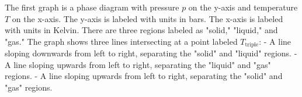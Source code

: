 The first graph is a phase diagram with pressure \( p \) on the y-axis and temperature \( T \) on the x-axis. The y-axis is labeled with units in bars. The x-axis is labeled with units in Kelvin. There are three regions labeled as "solid," "liquid," and "gas." The graph shows three lines intersecting at a point labeled \( T_{\text{triple}} \):
- A line sloping downwards from left to right, separating the "solid" and "liquid" regions.
- A line sloping upwards from left to right, separating the "liquid" and "gas" regions.
- A line sloping upwards from left to right, separating the "solid" and "gas" regions.
